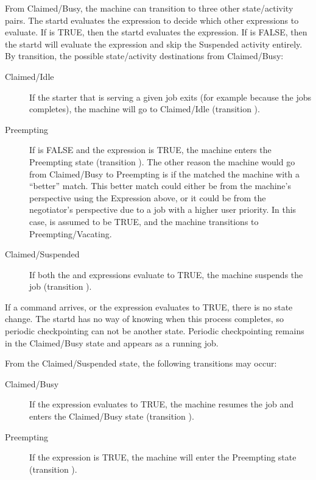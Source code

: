 From Claimed/Busy, the machine can transition to three other state/activity
pairs.
The startd evaluates the  expression to decide
which other expressions to evaluate.  
If  is TRUE, then the startd evaluates the
 expression.
If  is FALSE, then the startd will
evaluate the  expression and skip the Suspended activity
entirely.
By transition, the possible state/activity destinations from Claimed/Busy:

\begin{description}
  
\item[Claimed/Idle] If the starter that is serving a given job exits
  (for example because the jobs completes), the machine will go
  to Claimed/Idle (transition ).
  
\item[Preempting] If  is FALSE and the
   expression is TRUE, the machine enters the
  Preempting state (transition ).
  The other reason the machine would go from Claimed/Busy to
  Preempting is if the  matched the machine
  with a ``better'' match.  This better match could either be from the
  machine's perspective using the  Expression above,
  or it could be from the negotiator's perspective due to
  a job with a higher user priority.
  In this case,  is assumed to be TRUE, and the
  machine transitions to Preempting/Vacating.
  
\item[Claimed/Suspended] If both the  and
   expressions evaluate to TRUE, the machine
  suspends the job (transition ).
  
\end{description}
  
If a  command arrives,
or the  expression evaluates to TRUE,
there is no state change.
The startd has no way of knowing when this process completes,
so periodic checkpointing can not be another state.
Periodic checkpointing remains in the Claimed/Busy state
and appears as a running job.

From the Claimed/Suspended state, the following transitions
may occur:

\begin{description}
  
\item[Claimed/Busy] If the  expression evaluates to
  TRUE, the machine resumes the job and enters the
  Claimed/Busy state (transition ).

\item[Preempting] If the  expression is TRUE, the machine
  will enter the Preempting state (transition ).

\end{description}

